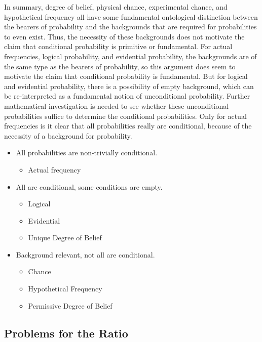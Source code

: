 In summary, degree of belief, physical chance, experimental chance, and hypothetical frequency all have some fundamental ontological distinction between the bearers of probability and the backgrounds that are required for probabilities to even exist. Thus, the necessity of these backgrounds does not motivate the claim that conditional probability is primitive or fundamental. For actual frequencies, logical probability, and evidential probability, the backgrounds are of the same type as the bearers of probability, so this argument does seem to motivate the claim that conditional probability is fundamental. But for logical and evidential probability, there is a possibility of empty background, which can be re-interpreted as a fundamental notion of unconditional probability. Further mathematical investigation is needed to see whether these unconditional probabilities suffice to determine the conditional probabilities. Only for actual frequencies is it clear that all probabilities really are conditional, because of the necessity of a background for probability.
\begin{itemize}
\item All probabilities are non-trivially conditional.
  \begin{itemize}
  \item Actual frequency
  \end{itemize}
\item All are conditional, some conditions are empty.
  \begin{itemize}
  \item Logical
  \item Evidential
  \item Unique Degree of Belief
  \end{itemize}
\item Background relevant, not all are conditional.
  \begin{itemize}
  \item Chance
  \item Hypothetical Frequency
  \item Permissive Degree of Belief
  \end{itemize}
\end{itemize}  


\subsection{Problems for the Ratio}\label{noratio}

